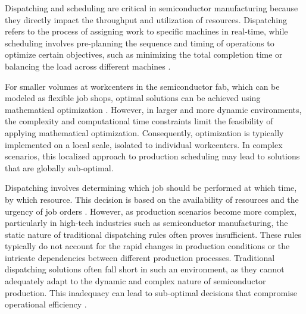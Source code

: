 
Dispatching and scheduling are critical in semiconductor manufacturing because they directly impact the throughput and utilization of resources. Dispatching refers to the process of assigning work to specific machines in real-time, while scheduling involves pre-planning the sequence and timing of operations to optimize certain objectives, such as minimizing the total completion time or balancing the load across different machines \cite{schumann2022scheduling}.

For smaller volumes at workcenters in the semiconductor fab, which can be modeled as flexible job shops, optimal solutions can be achieved using mathematical optimization \cite{waschneck2018deep}. However, in larger and more dynamic environments, the complexity and computational time constraints limit the feasibility of applying mathematical optimization. Consequently, optimization is typically implemented on a local scale, isolated to individual workcenters. In complex scenarios, this localized approach to production scheduling may lead to solutions that are globally sub-optimal.

Dispatching involves determining which job should be performed at which time, by which resource. This decision is based on the availability of resources and the urgency of job orders \cite{Hopp2011}. However, as production scenarios become more complex, particularly in high-tech industries such as semiconductor manufacturing, the static nature of traditional dispatching rules often proves insufficient. These rules typically do not account for the rapid changes in production conditions or the intricate dependencies between different production processes.  
Traditional dispatching solutions often fall short in such an environment, as they cannot adequately adapt to the dynamic and complex nature of semiconductor production. This inadequacy can lead to sub-optimal decisions that compromise operational efficiency \cite{Uzsoy1992}.

